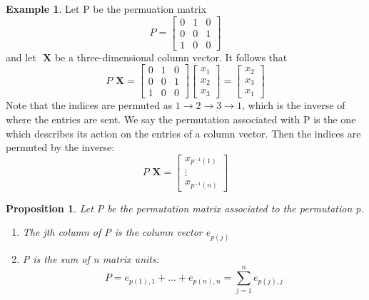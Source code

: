 \documentclass[12pt]{article}
\newtheorem{prop}[thm]{Proposition}
\theoremstyle{definition}
\newtheorem{eg}[thm]{Example}
\theoremstyle{remark}
\numberwithin{equation}{section}
\newcommand\B[1]{\textbf{ #1}}
\begin{document}
\begin{eg}
        Let P be the permuation matrix \begin{equation*}
                P = \begin{bmatrix} 0 & 1 & 0 \\ 0 & 0 & 1 \\ 1 & 0 & 0 \end{bmatrix}
        \end{equation*}
        and let $\B{X}$ be a three-dimensional column vector. It follows that \begin{equation*}
                P\B{X} = \begin{bmatrix} 0 & 1 & 0 \\ 0 & 0 & 1 \\ 1 & 0 & 0 \end{bmatrix}\begin{bmatrix} x_1 \\ x_2 \\ x_3 \end{bmatrix} = \begin{bmatrix} x_2 \\ x_3 \\ x_1 \end{bmatrix}
        \end{equation*}
        Note that the indices are permuted as $1 \rightarrow 2 \rightarrow 3 \rightarrow 1$, which is the inverse of where the entries are sent. We say the permutation associated with P is the one which describes its action on the entries of a column vector. Then the indices are permuted by the inverse: \begin{equation*}
                P\B{X} = \begin{bmatrix} x_{p^{-1}(1)} \\ \vdots \\ x_{p^{-1}(n)} \end{bmatrix}
        \end{equation*}
\end{eg}

\vspace{15pt}

\begin{prop}
        Let P be the permutation matrix associated to the permutation p.\begin{enumerate}
                \item The jth column of P is the column vector $e_{p(j)}$
                \item P is the sum of n matrix units: $$P = e_{p(1),1}+\hdots + e_{p(n),n} = \sum\limits_{j=1}^ne_{p(j),j}$$
        \end{enumerate}
\end{prop}
\end{document}
